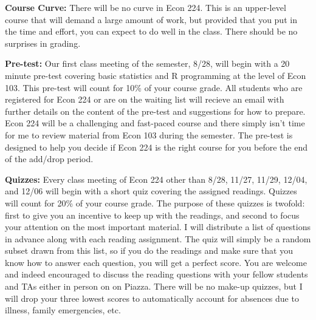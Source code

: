 \documentclass[11pt, letterpaper]{article}
\begin{document}
\medskip


\noindent \textbf{Course Curve:}
There will be no curve in Econ 224. 
This is an upper-level course that will demand a large amount of work, but provided that you put in the time and effort, you can expect to do well in the class. 
There should be no surprises in grading.

\medskip 

\noindent \textbf{Pre-test:} Our first class meeting of the semester, 8/28, will begin with a 20 minute pre-test covering basic statistics and R programming at the level of Econ 103.
This pre-test will count for 10\% of your course grade.
All students who are registered for Econ 224 or are on the waiting list will recieve an email with further details on the content of the pre-test and suggestions for how to prepare.
Econ 224 will be a challenging and fast-paced course and there simply isn't time for me to review material from Econ 103 during the semester.
The pre-test is designed to help you decide if Econ 224 is the right course for you before the end of the add/drop period.

\medskip


\noindent \textbf{Quizzes:} 
Every class meeting of Econ 224 other than 8/28, 11/27, 11/29, 12/04, and 12/06 will begin with a short quiz covering the assigned readings.
Quizzes will count for 20\% of your course grade.
The purpose of these quizzes is twofold: first to give you an incentive to keep up with the readings, and second to focus your attention on the most important material.
I will distribute a list of questions in advance along with each reading assignment.
The quiz will simply be a random subset drawn from this list, so if you do the readings and make sure that you know how to answer each question, you will get a perfect score.
You are welcome and indeed encouraged to discuss the reading questions with your fellow students and TAs either in person on on Piazza.
There will be no make-up quizzes, but I will drop your three lowest scores to automatically account for absences due to illness, family emergencies, etc.


\medskip
\end{document}
